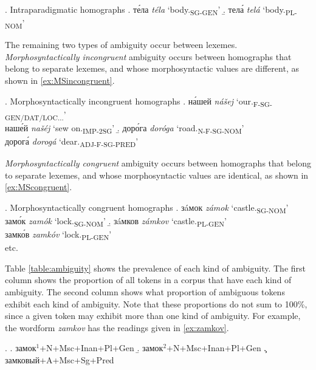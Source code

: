 \documentclass[11pt]{article}
\newcommand{\rus}[1]{\foreignlanguage{russian}{#1}}
\begin{document}
\ex. Intraparadigmatic homographs \label{ex:intrahom}
\a. \rus{т\'{е}ла} \emph{t\'{e}la} `body.\textsubscript{SG-GEN}' 
    \label{ex:bodySGGEN}
\b. \rus{тел\'{а}} \emph{tel\'{a}} `body.\textsubscript{PL-NOM}' 
    \label{ex:bodyPLNOM}

The remaining two types of ambiguity occur between lexemes. 
\emph{Morphosyntactically incongruent} ambiguity occurs between homographs that 
belong to separate lexemes, and whose morphosyntactic values are different, as 
shown in \ref{ex:MSincongruent}.

\ex. Morphosyntactically incongruent homographs \label{ex:MSincongruent}
\a. \rus{н\'{а}шей} \emph{nášej} `our.\textsubscript{F-SG-GEN/DAT/LOC...}'\\
    \rus{наш\'{е}й} \emph{našéj} `sew on.\textsubscript{IMP-2SG}'
\b. \rus{дор\'{о}га} \emph{doróga} `road.\textsubscript{N-F-SG-NOM}'\\
    \rus{дорог\'{а}} \emph{dorogá} `dear.\textsubscript{ADJ-F-SG-PRED}'

\emph{Morphosyntactically congruent} ambiguity occurs between homographs 
that belong to separate lexemes, and whose morphosyntactic values are identical, 
as shown in \ref{ex:MScongruent}.

\ex. Morphosyntactically congruent homographs \label{ex:MScongruent}
\a. \rus{з\'{a}мок} \emph{z\'{a}mok} `castle.\textsubscript{SG-NOM}'\\
	\rus{зам\'{о}к} \emph{zam\'{o}k} `lock.\textsubscript{SG-NOM}'
\b. \rus{з\'{a}мков} \emph{z\'{a}mkov} `castle.\textsubscript{PL-GEN}'\\
	\rus{замк\'{о}в} \emph{zamk\'{o}v} `lock.\textsubscript{PL-GEN}'\\
    etc.

Table \ref{table:ambiguity} shows the prevalence of each kind of 
ambiguity. The first column shows the proportion 
of all tokens in a corpus that have each kind of ambiguity. The second column 
shows what proportion of ambiguous tokens exhibit each kind of ambiguity.
Note that these proportions do not sum to 100\%, since a given token may 
exhibit more than one kind of ambiguity. For example, the wordform 
\emph{zamkov} has the readings given in \ref{ex:zamkov}.

\ex. \label{ex:zamkov}
	 \a. \rus{замок}$^1$+N+Msc+Inan+Pl+Gen \label{ex:zamkovA}
	 \b. \rus{замок}$^2$+N+Msc+Inan+Pl+Gen \label{ex:zamkovB}
	 \c. \rus{замковый}+A+Msc+Sg+Pred      \label{ex:zamkovC}
\end{document}
